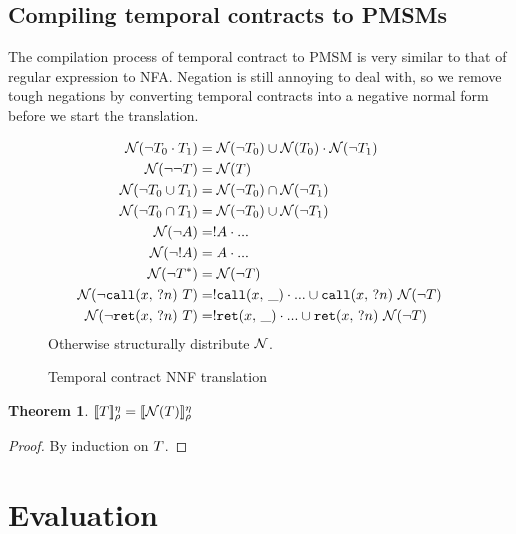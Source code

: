 \documentclass[preprint,onecolumn,9pt]{sigplanconf} %
\newtheorem{theorem}{Theorem}
\begin{document}
\subsection{Compiling temporal contracts to PMSMs}
%
The compilation process of temporal contract to PMSM is very similar to that of regular expression to NFA.
%
Negation is still annoying to deal with, so we remove tough negations by converting temporal contracts into a negative normal form before we start the translation.
%
\begin{figure}
  \begin{align*}
    {\mathcal N}(\neg T_0 \cdot T_1) &=
      {\mathcal N}(\neg T_0) \cup {\mathcal N}(T_0) \cdot {\mathcal N}(\neg T_1)
\\
    {\mathcal N}(\neg \neg T) &= {\mathcal N}(T)
\\
    {\mathcal N}(\neg T_0 \cup T_1) &= {\mathcal N}(\neg T_0) \cap {\mathcal N}(\neg T_1)
\\
    {\mathcal N}(\neg T_0 \cap T_1) &= {\mathcal N}(\neg T_0) \cup {\mathcal N}(\neg T_1)
\\
    {\mathcal N}(\neg A) &= ! A \cdot {\tt ...}
\\
    {\mathcal N}(\neg ! A) &= A \cdot {\tt ...}
\\
    {\mathcal N}(\neg T^*) &= {\mathcal N}(\neg T)
\\
    {\mathcal N}(\neg {\tt call}(x,\,{\tt ?}n)\ T) &= ! {\tt call}(x,\, \_) \cdot {\tt ...} \cup {\tt call}(x,\,{\tt ?}n)\ {\mathcal N}(\neg T)
\\
    {\mathcal N}(\neg {\tt ret}(x,\,{\tt ?}n)\ T) &= ! {\tt ret}(x,\, \_) \cdot {\tt ...} \cup {\tt ret}(x,\,{\tt ?}n)\ {\mathcal N}(\neg T)
  \end{align*}
  Otherwise structurally distribute ${\mathcal N}$.
  \caption{Temporal contract NNF translation}
  \label{fig:nnf}
\end{figure}
\begin{theorem}
  $[\![ T ]\!]^{\eta}_{\rho} = [\![ {\mathcal N}(T) ]\!]^{\eta}_{\rho}$
\end{theorem}
\begin{proof}
  By induction on $T$.
\end{proof}
\section{Evaluation}
\end{document}
